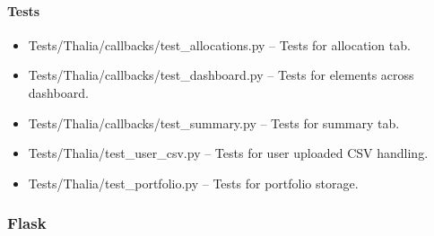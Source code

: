 \documentclass[main.tex]{subfiles}
\begin{document}
\paragraph{Tests}\label{tests-3}

\begin{itemize}

\item
  Tests/Thalia/callbacks/test\_allocations.py -- Tests for allocation tab.
\item
  Tests/Thalia/callbacks/test\_dashboard.py -- Tests for
  elements across dashboard.
\item
  Tests/Thalia/callbacks/test\_summary.py -- Tests for summary tab.
\item
  Tests/Thalia/test\_user\_csv.py -- Tests for user uploaded CSV
  handling.
\item
  Tests/Thalia/test\_portfolio.py -- Tests for portfolio storage.
\end{itemize}


\subsubsection{Flask}\label{flask}
\end{document}
